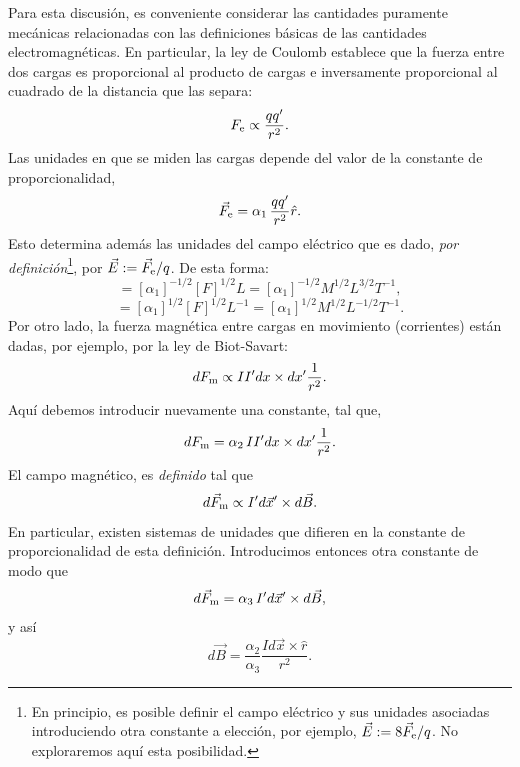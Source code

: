 Para esta discusión, es conveniente considerar las cantidades puramente mecánicas relacionadas con las definiciones básicas de las cantidades electromagnéticas. En particular, la ley de Coulomb establece que la fuerza entre dos cargas es proporcional al producto de cargas e inversamente proporcional al cuadrado de la distancia que las separa:
\begin{equation}
 F_{\rm e}\propto\frac{q q'}{r^2}.
\end{equation} 
Las unidades en que se miden las cargas depende del valor de la constante de proporcionalidad,
\begin{equation}
 \vec{F}_{\rm e}=\alpha_1\,\frac{q q'}{r^2}\hat{r}.
\end{equation} 
Esto determina además las unidades del campo eléctrico que es dado, \textit{por definición}\footnote{En principio, es posible definir el campo eléctrico y sus unidades asociadas introduciendo otra constante a elección, por ejemplo, $\vec{E}:=8 \vec{F}_{\rm e}/q$. No exploraremos aquí esta posibilidad.}, por $\vec{E}:=\vec{F}_{\rm e}/q$. De esta forma:
\begin{equation}
 [q]=[\alpha_1]^{-1/2}[F]^{1/2}L =[\alpha_1]^{-1/2}M^{1/2}L^{3/2}T^{-1},
\end{equation}
\begin{equation}
 [E]=[\alpha_1]^{1/2}[F]^{1/2}L^{-1}=[\alpha_1]^{1/2}M^{1/2}L^{-1/2}T^{-1}.
\end{equation}
Por otro lado, la fuerza magnética entre cargas en movimiento (corrientes) están dadas, por ejemplo, por la ley de Biot-Savart:
\begin{equation}
 dF_{\rm m}\propto II' dx \times dx' \frac{1}{r^2}.
\end{equation}
Aquí debemos introducir nuevamente una constante, tal que,
\begin{equation}
 dF_{\rm m}=\alpha_2\, II'dx \times dx' \frac{1}{r^2}. \label{dfe}
\end{equation}
El campo magnético, es \textit{definido} tal que
\begin{equation}
 d\vec{F}_{\rm m}\propto I'd\vec{x}' \times d\vec{B}.
\end{equation}
En particular, existen sistemas de unidades que difieren en la constante de proporcionalidad de esta definición. Introducimos entonces otra constante de modo que
\begin{equation}\label{dFa3}
 d\vec{F}_{\rm m}=\alpha_3\,I'd\vec{x}' \times d\vec{B},
\end{equation}
y así
\begin{equation}
 d\vec{B}=\frac{\alpha_2}{\alpha_3} \frac{Id\vec{x}\times\hat{r}}{r^2}.
\end{equation}
